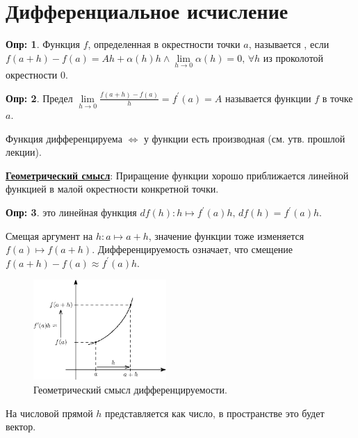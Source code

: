 \documentclass[12pt]{article}
\theoremstyle{definition}
\newtheorem{defn}{Опр:}
\begin{document}

\section*{Дифференциальное исчисление}

\begin{defn}
	Функция $f$, определенная в окрестности точки $a$, называется , если $f(a+h) - f(a) = Ah + \alpha(h)h \wedge \lim\limits_{h \to 0} \alpha(h) = 0, \, \forall h$ из проколотой окрестности $0$.
\end{defn}	

\begin{defn}
	Предел $\lim\limits_{h \to 0}\tfrac{f(a+h) - f(a)}{h} = f^\prime(a) = A$ называется   функции $f$ в точке $a$.
\end{defn}	

Функция дифференцируема $\Leftrightarrow$ у функции есть производная (см. утв. прошлой лекции).

\uline{\textbf{Геометрический смысл}}: Приращение функции хорошо приближается линейной функцией в малой окрестности конкретной точки.

\begin{defn}
	 это линейная функция $df(h) \colon h \mapsto f^\prime(a) h, \, df(h) = f^\prime(a) h$.
\end{defn}

Смещая аргумент на $h \colon a \mapsto a + h$, значение функции тоже изменяется $f(a) \mapsto f(a+h)$. Дифференцируемость означает, что смещение $f(a+h) - f(a) \approx f^\prime(a)h$.

\begin{figure}[H]
	\centering
	\includegraphics[width=0.45\textwidth]{22_1.eps}
	\caption{Геометрический смысл дифференцируемости.}
	\label{22_1}
\end{figure}

На числовой прямой $h$ представляется как число, в пространстве это будет вектор.
\end{document}
